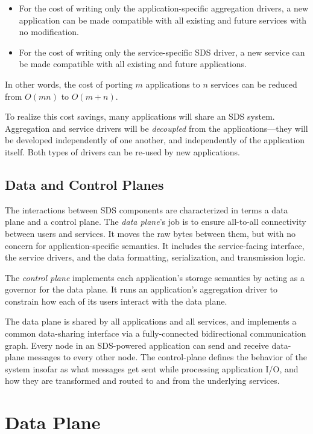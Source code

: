 \begin{itemize}
    \item For the cost of writing only the application-specific
aggregation drivers, a new application can be made
compatible with all existing and future services with no modification.
    \item For the cost of writing only the service-specific SDS driver, a new
service can be made compatible with all existing and future applications.
\end{itemize}

In other words, the cost of porting $m$ applications to $n$ services can be
reduced from $O(mn)$ to $O(m+n)$.

To realize this cost savings, many applications will share an SDS system.  Aggregation and service drivers
will be \emph{decoupled} from the applications---they will be
developed independently of one another, and independently of the
application itself.  Both types of drivers can be re-used by new applications.

\subsection{Data and Control Planes}

The interactions between SDS components are characterized in terms a data plane and a control plane.
The \emph{data plane}'s job
is to ensure all-to-all connectivity between users and services.
It moves the raw bytes between them, but with no concern for
application-specific semantics.  It includes the service-facing interface, the
service drivers, and the data formatting, serialization, and transmission
logic.

The \emph{control plane} implements each application's
storage semantics by acting as a governor for the data plane.
It runs an application's aggregation driver 
to constrain how each of its users interact with the data plane.

The data plane is shared by all applications and all services, and implements a
common data-sharing interface via a fully-connected bidirectional communication graph.
Every node in an SDS-powered application can send and receive data-plane
messages to every other node.  The control-plane defines the behavior of the
system insofar as what messages get sent while processing application I/O, and how they are
transformed and routed to and from the underlying services.

\section{Data Plane}

